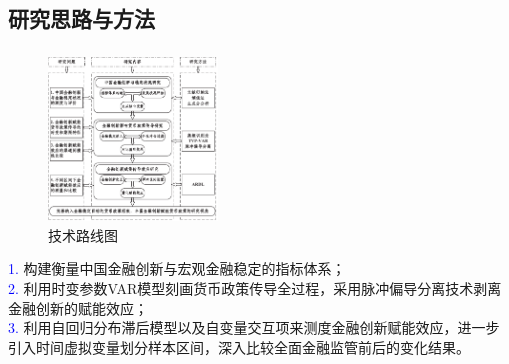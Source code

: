 \documentclass[12pt,aspectratio=169]{ctexbeamer}
\begin{document}
			\subsection{研究思路与方法}
			\begin{frame}[label=thought]
				\frametitle{}
				\begin{figure}
					\vspace{-15mm}
					\centering
					\includegraphics[width=0.4\textwidth]{figures/fig.1-2}
					\caption{技术路线图}
					\label{map}
				\end{figure}
				\normalsize
				\justifying
				\hspace{2em}
				\textcolor{blue}{1.} 构建衡量中国金融创新与宏观金融稳定的指标体系；\\
				\hspace{2em}
				\textcolor{blue}{2.} 利用时变参数VAR模型刻画货币政策传导全过程，采用脉冲偏导分离技术剥离金融创新的赋能效应；\\
				\hspace{2em}
				\textcolor{blue}{3.} 利用自回归分布滞后模型以及自变量交互项来测度金融创新赋能效应，进一步引入时间虚拟变量划分样本区间，深入比较全面金融监管前后的变化结果。
				\hyperlink{pr}{\beamergotobutton{}}
			\end{frame}
			
\end{document}
